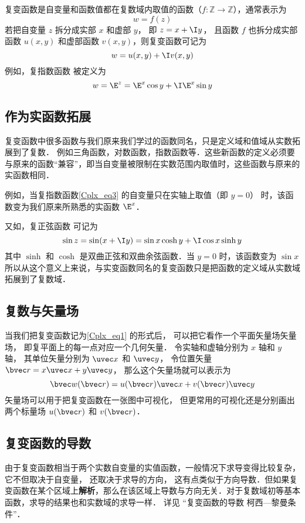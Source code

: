 

复变函数是自变量和函数值都在复数域内取值的函数（$f:\mathbb Z \to \mathbb Z$），通常表示为
\begin{equation}
w = f(z)
\end{equation}
若把自变量 $z$ 拆分成实部 $x$ 和虚部 $y$， 即 $z = x + \I y$， 且函数 $f$ 也拆分成实部函数 $u(x,y)$ 和虚部函数 $v(x,y)$，则复变函数可记为
\begin{equation}\label{Cplx_eq1}
w = u(x,y) + \I v(x,y)
\end{equation}
例如，复指数函数 被定义为
\begin{equation}\label{Cplx_eq3}
w = \E^z = \E^x \cos y + \I \E^x\sin y
\end{equation}

\subsection{作为实函数拓展}
复变函数中很多函数与我们原来我们学过的函数同名，只是定义域和值域从实数拓展到了复数． 例如三角函数，对数函数，指数函数等．这些新函数的定义必须要与原来的函数“兼容”，即当自变量被限制在实数范围内取值时，这些函数与原来的实函数相同．

例如，当复指数函数\autoref{Cplx_eq3} 的自变量只在实轴上取值（即 $y = 0$） 时，该函数变为我们原来所熟悉的实函数 $\E^x$． 

又如，复正弦函数 可记为
\begin{equation}
\sin z = \sin(x + \I y) = \sin x\cosh y + \I\cos x\sinh y
\end{equation}
其中 $\sinh $ 和 $\cosh $ 是双曲正弦和双曲余弦函数．当 $y = 0$ 时，该函数变为 $\sin x$ 
所以从这个意义上来说，与实变函数同名的复变函数只是把函数的定义域从实数域拓展到了复数域．

\subsection{复数与矢量场}
当我们把复变函数记为\autoref{Cplx_eq1} 的形式后， 可以把它看作一个平面矢量场矢量场， 即复平面上的每一点对应一个几何矢量． 令实轴和虚轴分别为 $x$ 轴和 $y$ 轴， 其单位矢量分别为 $\uvec x$ 和 $\uvec y$， 令位置矢量 $\bvec r = x \uvec x + y \uvec y$， 那么这个矢量场就可以表示为
\begin{equation}
\bvec w(\bvec r) = u(\bvec r) \uvec x + v(\bvec r) \uvec y
\end{equation}
矢量场可以用于把复变函数在一张图中可视化， 但更常用的可视化还是分别画出两个标量场 $u(\bvec r)$ 和 $v(\bvec r)$．

\subsection{复变函数的导数}
由于复变函数相当于两个实数自变量的实值函数，一般情况下求导变得比较复杂， 它不但取决于自变量， 还取决于求导的方向， 这有点类似于方向导数．但如果复变函数在某个区域上\textbf{解析}，那么在该区域上导数与方向无关．对于复数域初等基本函数，求导的结果也和实数域的求导一样． 详见 “复变函数的导数 柯西—黎曼条件”．

